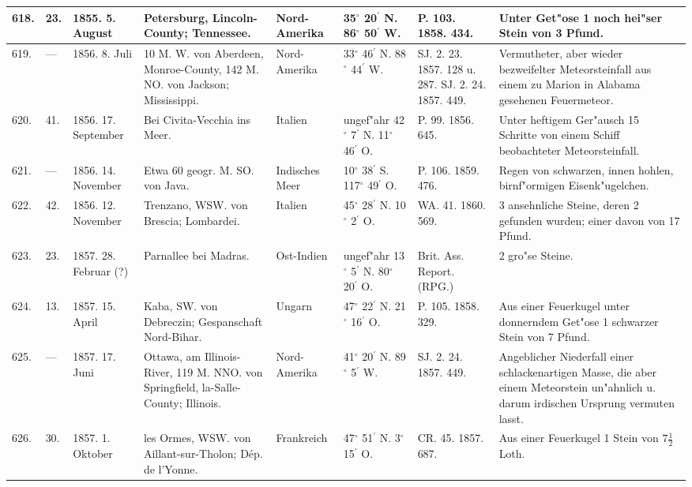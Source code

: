 \documentclass[a4paper, 8pt, oneside, polutonikogreek, german]{article}
\begin{document}
\begin{center}
\begin{longtable}{| p{4mm} | p{2mm} | p{15mm} | p{25mm} | p{16mm} | p{12mm} | p{13mm} | p{20mm} |}
        618. & 23. & 1855. 5. August & Petersburg, Lincoln-County; Tennessee. & Nord-Amerika & 35$^\circ$ 20$^\prime$ N. 86$^\circ$ 50$^\prime$ W. & P. 103. 1858. 434. & Unter Get"ose 1 noch hei"ser Stein von 3 Pfund. \\ \hline
        619. & --- & 1856. 8. Juli & 10 M. W. von Aberdeen, Monroe-County, 142 M. NO. von Jackson; Mississippi. & Nord-Amerika & 33$^\circ$ 46$^\prime$ N. 88$^\circ$ 44$^\prime$ W. & SJ. 2. 23. 1857. 128 u. 287. SJ. 2. 24. 1857. 449. & Vermutheter, aber wieder bezweifelter Meteorsteinfall aus einem zu Marion in Alabama gesehenen Feuermeteor. \\ \hline
        620. & 41. & 1856. 17. September & Bei Civita-Vecchia ins Meer. & Italien & ungef"ahr 42$^\circ$ 7$^\prime$ N. 11$^\circ$ 46$^\prime$ O. & P. 99. 1856. 645. & Unter heftigem Ger"ausch 15 Schritte von einem Schiff beobachteter Meteorsteinfall. \\ \hline
        621. & --- & 1856. 14. November & Etwa 60 geogr. M. SO. von Java. & Indisches Meer & 10$^\circ$ 38$^\prime$ S. 117$^\circ$ 49$^\prime$ O. & P. 106. 1859. 476. & Regen von schwarzen, innen hohlen, birnf"ormigen Eisenk"ugelchen. \\ \hline
        622. & 42. & 1856. 12. November & Trenzano, WSW. von Brescia; Lombardei. & Italien & 45$^\circ$ 28$^\prime$ N. 10$^\circ$ 2$^\prime$ O. & WA. 41. 1860. 569. & 3 ansehnliche Steine, deren 2 gefunden wurden; einer davon von 17 Pfund. \\ \hline
        623. & 23. & 1857. 28. Februar (?) & Parnallee bei Madras. & Ost-Indien & ungef"ahr 13$^\circ$ 5$^\prime$ N. 80$^\circ$ 20$^\prime$ O. & Brit. Ass. Report. (RPG.) & 2 gro"se Steine. \\ \hline
        624. & 13. & 1857. 15. April & Kaba, SW. von Debreczin; Gespanschaft Nord-Bihar. & Ungarn & 47$^\circ$ 22$^\prime$ N. 21$^\circ$ 16$^\prime$ O. & P. 105. 1858. 329. & Aus einer Feuerkugel unter donnerndem Get"ose 1 schwarzer Stein von 7 Pfund. \\ \hline
        625. & --- & 1857. 17. Juni & Ottawa, am Illinois-River, 119 M. NNO. von Springfield, la-Salle-County; Illinois. & Nord-Amerika & 41$^\circ$ 20$^\prime$ N. 89$^\circ$ 5$^\prime$ W. & SJ. 2. 24. 1857. 449. & Angeblicher Niederfall einer schlackenartigen Masse, die aber einem Meteorstein un"ahnlich u. darum irdischen Ursprung vermuten lasst. \\ \hline
        626. & 30. & 1857. 1. Oktober & les Ormes, WSW. von Aillant-sur-Tholon; Dép. de l'Yonne. & Frankreich & 47$^\circ$ 51$^\prime$ N. 3$^\circ$ 15$^\prime$ O. & CR. 45. 1857. 687. & Aus einer Feuerkugel 1 Stein von $7\frac{1}{2}$ Loth. \\ \hline

\end{longtable}
\end{center}
\end{document}
